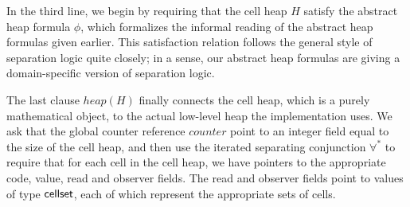 \documentclass[preprint,natbib]{sigplanconf}
\begin{document}
In the third line, we begin by requiring that the cell heap $H$ satisfy
the abstract heap formula $\phi$, which formalizes the informal
reading of the abstract heap formulas given earlier. This satisfaction
relation follows the general style of separation logic quite closely; 
in a sense, our abstract heap formulas are giving a domain-specific
version of separation logic.

The last clause $heap(H)$ finally connects the cell heap, which is a purely
mathematical object, to the actual low-level heap the implementation
uses. We ask that the global counter reference $counter$ point to an integer
field equal to the size of the cell heap, and then use the iterated
separating conjunction $\forall^*$ to require that for each cell in
the cell heap, we have pointers to the appropriate code, value, read
and observer fields. The read and observer fields point to values of
type $\mbox{\textsf{{cellset}}}$, each of which represent the appropriate sets of cells. 
\end{document}
